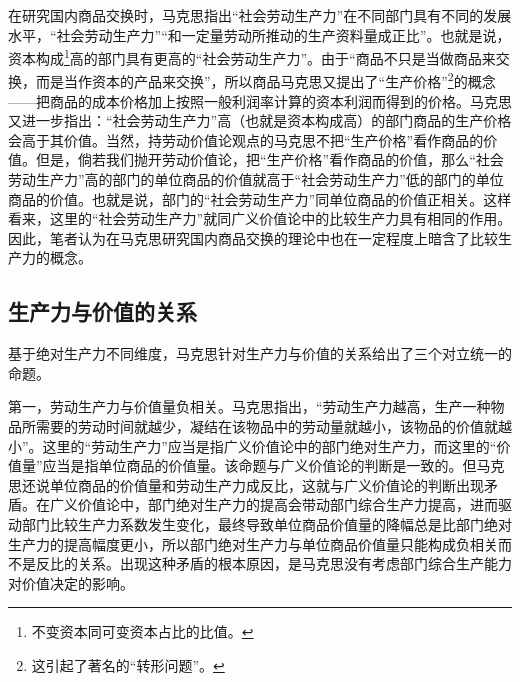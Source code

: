 在研究国内商品交换时，马克思指出“社会劳动生产力”在不同部门具有不同的发展水平，“社会劳动生产力”“和一定量劳动所推动的生产资料量成正比”\cite[183]{ZhongGongZhongYangMaKeSiEnGeSiLieNingSiDaLinZhuZuoBianYiJuMaKeSiEnGeSiWenJiDi7Juan2009}。也就是说，资本构成\footnote{不变资本同可变资本占比的比值\cite[183]{ZhongGongZhongYangMaKeSiEnGeSiLieNingSiDaLinZhuZuoBianYiJuMaKeSiEnGeSiWenJiDi7Juan2009}。}高的部门具有更高的“社会劳动生产力”。由于“商品不只是当做商品来交换，而是当作资本的产品来交换”\cite[196]{ZhongGongZhongYangMaKeSiEnGeSiLieNingSiDaLinZhuZuoBianYiJuMaKeSiEnGeSiWenJiDi7Juan2009}，所以商品马克思又提出了“生产价格”\footnote{这引起了著名的“转形问题”\cite{XieFuShengXiFangXueZheGuanYuMaKeSiJieZhiZhuanXingLiLunYanJiuShuPing2000}。}的概念——把商品的成本价格加上按照一般利润率计算的资本利润而得到的价格\cite[177]{ZhongGongZhongYangMaKeSiEnGeSiLieNingSiDaLinZhuZuoBianYiJuMaKeSiEnGeSiWenJiDi7Juan2009}。马克思又进一步指出：“社会劳动生产力”高（也就是资本构成高）的部门商品的生产价格会高于其价值\cite[183-184]{ZhongGongZhongYangMaKeSiEnGeSiLieNingSiDaLinZhuZuoBianYiJuMaKeSiEnGeSiWenJiDi7Juan2009}。当然，持劳动价值论观点的马克思不把“生产价格”看作商品的价值。但是，倘若我们抛开劳动价值论，把“生产价格”看作商品的价值，那么“社会劳动生产力”高的部门的单位商品的价值就高于“社会劳动生产力”低的部门的单位商品的价值。也就是说，部门的“社会劳动生产力”同单位商品的价值正相关。这样看来，这里的“社会劳动生产力”就同广义价值论中的比较生产力具有相同的作用。因此，笔者认为在马克思研究国内商品交换的理论中也在一定程度上暗含了比较生产力的概念。

\subsection{生产力与价值的关系}

基于绝对生产力不同维度，马克思针对生产力与价值的关系给出了三个对立统一的命题\cite[273]{CaiJiMingCongGuDianZhengZhiJingJiXueDaoZhongGuoTeSeSheHuiZhuYiZhengZhiJingJiXueJiYuZhongGuoShiJiaoDeZhengZhiJingJiXueYanBianShangCe2023}。

第一，劳动生产力与价值量负相关。马克思指出，“劳动生产力越高，生产一种物品所需要的劳动时间就越少，凝结在该物品中的劳动量就越小，该物品的价值就越小”\cite[53]{ZhongGongZhongYangMaKeSiEnGeSiLieNingSiDaLinZhuZuoBianYiJuMaKeSiEnGeSiWenJiDi5Juan2009}。这里的“劳动生产力”应当是指广义价值论中的部门绝对生产力，而这里的“价值量”应当是指单位商品的价值量\cite[273]{CaiJiMingCongGuDianZhengZhiJingJiXueDaoZhongGuoTeSeSheHuiZhuYiZhengZhiJingJiXueJiYuZhongGuoShiJiaoDeZhengZhiJingJiXueYanBianShangCe2023}。该命题与广义价值论的判断是一致的。但马克思还说单位商品的价值量和劳动生产力成反比\cite[53-54]{ZhongGongZhongYangMaKeSiEnGeSiLieNingSiDaLinZhuZuoBianYiJuMaKeSiEnGeSiWenJiDi5Juan2009}，这就与广义价值论的判断出现矛盾。在广义价值论中，部门绝对生产力的提高会带动部门综合生产力提高，进而驱动部门比较生产力系数发生变化，最终导致单位商品价值量的降幅总是比部门绝对生产力的提高幅度更小，所以部门绝对生产力与单位商品价值量只能构成负相关而不是反比的关系\cite[274, 282]{CaiJiMingCongGuDianZhengZhiJingJiXueDaoZhongGuoTeSeSheHuiZhuYiZhengZhiJingJiXueJiYuZhongGuoShiJiaoDeZhengZhiJingJiXueYanBianShangCe2023}。出现这种矛盾的根本原因，是马克思没有考虑部门综合生产能力对价值决定的影响。

